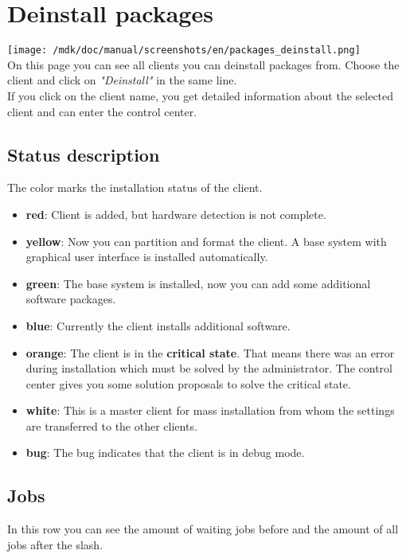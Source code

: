 \section{Deinstall packages}
\texttt{[image: /mdk/doc/manual/screenshots/en/packages\_deinstall.png]} \\
On this page you can see all clients you can deinstall packages from. Choose the client and click on \textit{"Deinstall"} in the same line.\\
If you click on the client name, you get detailed information about the selected client and can enter the control center.\\
\subsection{Status description}
The color marks the installation status of the client.\\
\begin{itemize}
\item \textbf{red}: Client is added, but hardware detection is not complete.\\
\item \textbf{yellow}: Now you can partition and format the client. A base system with graphical user interface is installed automatically.\\
\item \textbf{green}: The base system is installed, now you can add some additional software packages.\\
\item \textbf{blue}: Currently the client installs additional software.\\
\item \textbf{orange}: The client is in the \textbf{critical state}. That means there was an error during installation which must be solved by the administrator. The control center gives you some solution proposals to solve the critical state.\\
\item \textbf{white}: This is a master client for mass installation from whom the settings are transferred to the other clients.\\
\item \textbf{bug}: The bug indicates that the client is in debug mode.\\
\end{itemize}
\subsection{Jobs}
In this row you can see the amount of waiting jobs before and the amount of all jobs after the slash.\\
